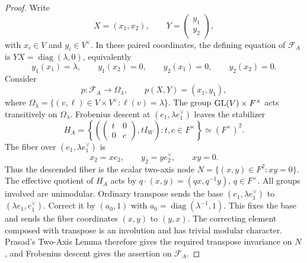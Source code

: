\begin{proof}
Write
\[
    X=(x_1,x_2),
    \qquad
    Y=\begin{pmatrix}y_1\\y_2\end{pmatrix},
\]
with $x_i\in V$ and $y_i\in V^\vee$. In these paired coordinates, the
defining equation of $\mathcal F_A$ is $YX=\operatorname{diag}(\lambda,0)$,
equivalently
\[
    y_1(x_1)=\lambda,
    \qquad
    y_1(x_2)=0,
    \qquad
    y_2(x_1)=0,
    \qquad
    y_2(x_2)=0.
\]
Consider
\[
    p:\mathcal F_A\longrightarrow
    \Omega_\lambda,
    \qquad
    p(X,Y)=(x_1,y_1),
\]
where \(\Omega_\lambda= \{(v,\ell)\in V\times V^\vee:\ell(v)=\lambda\}\). The group $\operatorname{GL}(V)\times
F^\times$ acts transitively on $\Omega_\lambda$.
Frobenius descent at $(e_1,\lambda e_1^\vee)$ leaves the stabilizer
\[
    H_A=
    \left\{
    \left(
    \begin{pmatrix}t&0\\0&c\end{pmatrix},
    tI_W
    \right):
    t,c\in F^\times
    \right\}
    \simeq(F^\times)^2.
\]
The fiber over $(e_1,\lambda e_1^\vee)$ is
\[
    x_2=xe_2,
    \qquad
    y_2=ye_2^\vee,
    \qquad
    xy=0.
\]
Thus the descended fiber is the scalar two-axis node \(N=\{(x,y)\in F^2:xy=0\}\). The effective quotient
of $H_A$ acts by \(q\cdot(x,y)=(qx,q^{-1}y)\), \(q\in F^\times\). All groups involved are
unimodular. Ordinary transpose sends the base
$(e_1,\lambda e_1^\vee)$ to $(\lambda e_1,e_1^\vee)$. Correct it by
$(a_0,1)$ with $a_0=\operatorname{diag}(\lambda^{-1},1)$. This fixes the
base and sends the fiber coordinates $(x,y)$ to $(y,x)$.
The correcting element composed with transpose is an involution and has
trivial modular character. Prasad's Two-Axis Lemma therefore gives the required
transpose invariance on $N$, and Frobenius descent gives the assertion on
$\mathcal F_A$.
\end{proof}

